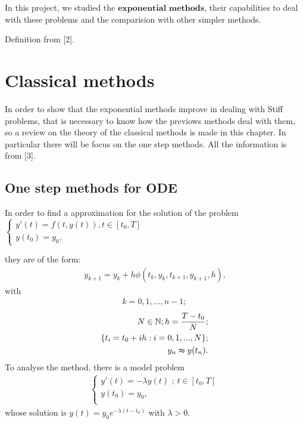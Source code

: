 \documentclass[letterpaper,10pt,english]{jupyterBook}
\begin{document}
\sphinxAtStartPar
In this project, we studied the \(\textbf{exponential methods}\), their capabilities to deal with these problems and the comparision with other simpler methods.

\sphinxAtStartPar
Definition from {[}2{]}.

\sphinxstepscope


\section{Classical methods}
\label{\detokenize{cap2:classical-methods}}\label{\detokenize{cap2::doc}}
\sphinxAtStartPar
In order to show that the exponential methods improve in dealing with Stiff problems, that is necessary to know how the previows methods deal with them, so a review on the theory of the classical methods is made in this chapter. In particular there will be focus on the one step methods. All the information is from {[}3{]}.


\subsection{One step methods for ODE}
\label{\detokenize{cap2:one-step-methods-for-ode}}
\sphinxAtStartPar
In order to find a approximation for the solution of the problem
\(\begin{cases}
y'(t) = f(t, y(t)), t \in [t_0,T] \\
y(t_0)=y_0 \text{,}
\end{cases}\)

\sphinxAtStartPar
they are of the form:
\begin{equation*}
\begin{split}
y_{k+1} = y_{k} + h \phi (t_{k},y_{k},t_{k+1},y_{k+1},h) \text{,}
\end{split}
\end{equation*}
\sphinxAtStartPar
with
\begin{equation*}
\begin{split}k = 0, 1, ..., n-1;\end{split}
\end{equation*}\begin{equation*}
\begin{split}
N \in \mathbb{N}; h = \frac{T-t_0}{N}; \\
\{t_i = t_0 + ih : i = 0, 1, ..., N\}; \\ 
y_n \thickapprox y(t_n) .
\end{split}
\end{equation*}
\sphinxAtStartPar
To analyse the method, there is a model problem
\begin{equation*}
\begin{split}
\begin{cases}
    y'(t) = - \lambda y(t) \text{ ; } t \in[t_0,T]\\ 
    y(t_0)=y_0,\\
\end{cases}
\end{split}
\end{equation*}
\sphinxAtStartPar
whose solution is \(y(t) = y_0 e^{-\lambda (t-t_0)}\)
with \(\lambda > 0.\)
\end{document}
